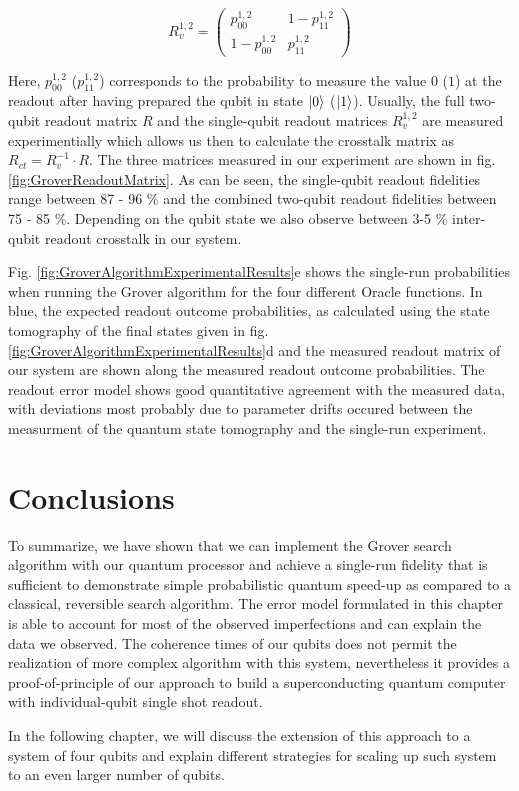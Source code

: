 \begin{equation}
R_{v}^{1,2} = \left(
			\begin{array}{cc}
				p_{00}^{1,2} & 1-p_{11}^{1,2} \\
				1-p_{00}^{1,2} & p_{11}^{1,2}
			\end{array}
		\right)
\end{equation}

Here, $p_{00}^{1,2}$ ($p_{11}^{1,2}$) corresponds to the probability to measure the value $0$ ($1$) at the readout after having prepared the qubit in state $\left| 0 \right>$ ($\left| 1 \right>$). Usually, the full two-qubit readout matrix $R$ and the single-qubit readout matrices $R_{v}^{1,2}$ are measured experimentially which allows us then to calculate the crosstalk matrix as $R_{ct} = R_{v}^{-1}\cdot R$. The three matrices measured in our experiment are shown in fig. \ref{fig:GroverReadoutMatrix}. As can be seen, the single-qubit readout fidelities range between 87 - 96 \% and the combined two-qubit readout fidelities between 75 - 85 \%. Depending on the qubit state we also observe between 3-5 \% inter-qubit readout crosstalk in our system.

\smallskip

Fig. \ref{fig:GroverAlgorithmExperimentalResults}e shows the single-run probabilities when running the Grover algorithm for the four different Oracle functions. In blue, the expected readout outcome probabilities, as calculated using the state tomography of the final states given in fig. \ref{fig:GroverAlgorithmExperimentalResults}d and the measured readout matrix of our system are shown along the measured readout outcome probabilities. The readout error model shows good quantitative agreement with the measured data, with deviations most probably due to parameter drifts occured between the measurment of the quantum state tomography and the single-run experiment.

\section{Conclusions}

To summarize, we have shown that we can implement the Grover search algorithm with our quantum processor and achieve a single-run fidelity that is sufficient to demonstrate simple probabilistic quantum speed-up as compared to a classical, reversible search algorithm. The error model formulated in this chapter is able to account for most of the observed imperfections and can explain the data we observed. The coherence times of our qubits does not permit the realization of more complex algorithm with this system, nevertheless it provides a proof-of-principle of our approach to build a superconducting quantum computer with individual-qubit single shot readout.

\smallskip

In the following chapter, we will discuss the extension of this approach to a system of four qubits and explain different strategies for scaling up such system to an even larger number of qubits.

